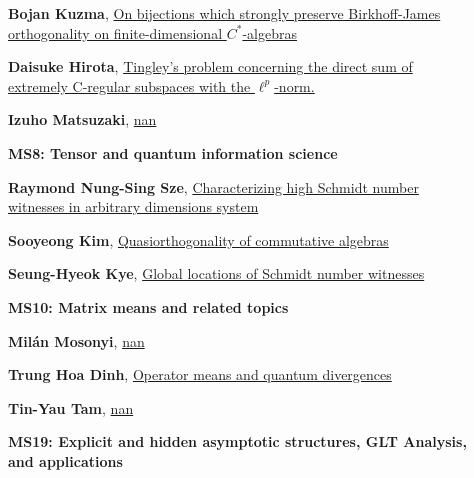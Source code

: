 \documentclass[ILAS2025-program.tex]{subfiles}
\begin{document}
\begin{description}
\begin{description}
    \item[] \hypertarget{up0247}{}\textbf{Bojan Kuzma}, \hyperlink{down0247}{On bijections which strongly preserve Birkhoff-James orthogonality on finite-dimensional $C^*$-algebras}
        \item[] \hypertarget{up0248}{}\textbf{Daisuke Hirota}, \hyperlink{down0248}{Tingley's problem concerning the direct sum of extremely C-regular subspaces with the $\ell^p$-norm.}
        \item[] \hypertarget{up0249}{}\textbf{Izuho Matsuzaki}, \hyperlink{down0249}{nan}
        \end{description}
    \begin{description}
    \item[] {\color{mstitle}\textbf{MS8: Tensor and quantum information science}} 
    \item[] \hypertarget{up0250}{}\textbf{Raymond Nung-Sing Sze}, \hyperlink{down0250}{Characterizing high Schmidt number witnesses in arbitrary dimensions system
}
        \item[] \hypertarget{up0251}{}\textbf{Sooyeong Kim}, \hyperlink{down0251}{Quasiorthogonality of commutative algebras
}
        \item[] \hypertarget{up0252}{}\textbf{Seung-Hyeok Kye}, \hyperlink{down0252}{Global locations of Schmidt number witnesses
}
        \end{description}
    \begin{description}
    \item[] {\color{mstitle}\textbf{MS10: Matrix means and related topics}} 
    \item[] \hypertarget{up0253}{}\textbf{Milán Mosonyi}, \hyperlink{down0253}{nan}
        \item[] \hypertarget{up0254}{}\textbf{Trung Hoa Dinh}, \hyperlink{down0254}{Operator means and quantum divergences}
        \item[] \hypertarget{up0255}{}\textbf{Tin-Yau Tam}, \hyperlink{down0255}{nan}
        \end{description}
    \begin{description}
    \item[] {\color{mstitle}\textbf{MS19: Explicit and hidden asymptotic structures, GLT Analysis, and applications}} 

\end{description}
\end{description}
\end{document}
